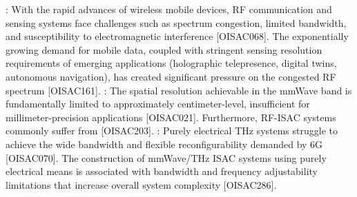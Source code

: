 {}\markdownRendererOlBegin
{}: With the rapid advances of wireless mobile devices, RF communication and sensing systems face challenges such as spectrum congestion, limited bandwidth, and susceptibility to electromagnetic interference [O\markdownRendererUnderscore{}ISAC\markdownRendererUnderscore{}068]. The exponentially growing demand for mobile data, coupled with stringent sensing resolution requirements of emerging applications (holographic telepresence, digital twins, autonomous navigation), has created significant pressure on the congested RF spectrum [O\markdownRendererUnderscore{}ISAC\markdownRendererUnderscore{}161].\markdownRendererOlItemEnd 
{}: The spatial resolution achievable in the mmWave band is fundamentally limited to approximately centimeter-level, insufficient for millimeter-precision applications [O\markdownRendererUnderscore{}ISAC\markdownRendererUnderscore{}021]. Furthermore, RF-ISAC systems commonly suffer from  [O\markdownRendererUnderscore{}ISAC\markdownRendererUnderscore{}203].\markdownRendererOlItemEnd 
{}: Purely electrical THz systems struggle to achieve the wide bandwidth and flexible reconfigurability demanded by 6G [O\markdownRendererUnderscore{}ISAC\markdownRendererUnderscore{}070]. The construction of mmWave/THz ISAC systems using purely electrical means is associated with bandwidth and frequency adjustability limitations that increase overall system complexity [O\markdownRendererUnderscore{}ISAC\markdownRendererUnderscore{}286].\markdownRendererOlItemEnd 
\markdownRendererOlEnd \markdownRendererInterblockSeparator
